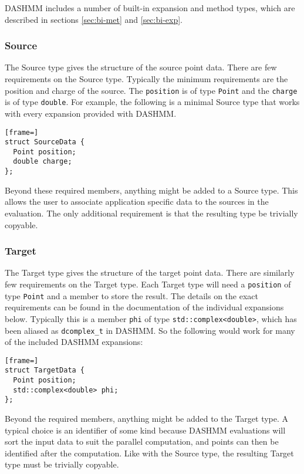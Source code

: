 DASHMM includes a number of built-in expansion and method types, which are
described in sections \ref{sec:bi-met} and \ref{sec:bi-exp}.


\subsubsection{Source}
The Source type gives the structure of the source point data. There
are few requirements on the Source type. Typically the minimum
requirements are the position and charge of the source. The \texttt{position}
is of type \texttt{Point} and the \texttt{charge} is of type
\texttt{double}. For example, the following is a minimal Source type that
works with every expansion provided with DASHMM.

\begin{lstlisting}[frame=]
struct SourceData {
  Point position;
  double charge;
};
\end{lstlisting}

\noindent Beyond these required members, anything might be added to a Source
type. This allows the user to associate application specific data to
the sources in the evaluation. The only additional requirement is that
the resulting type be trivially copyable.

\subsubsection{Target}
The Target type gives the structure of the target point data. There
are similarly few requirements on the Target type. Each Target type
will need a \texttt{position} of type \texttt{Point} and a member to store
the result. The details on the exact requirements can be found in the
documentation of the individual expansions below. Typically this is a
member \texttt{phi} of type \texttt{std::complex<double>}, which has been
aliased as \texttt{dcomplex\_t} in DASHMM. So the following would work
for many of the included DASHMM expansions:

\begin{lstlisting}[frame=]
struct TargetData {
  Point position;
  std::complex<double> phi;
};
\end{lstlisting}

\noindent Beyond the required members, anything might be added to the Target
type. A typical choice is an identifier of some kind because DASHMM
evaluations will sort the input data to suit the parallel computation,
and points can then be identified after the computation. Like with the
Source type, the resulting Target type must be trivially copyable.

